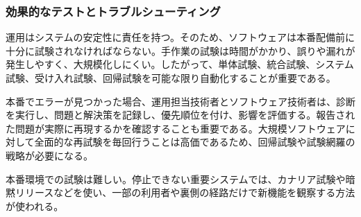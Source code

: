 \subsubsection{効果的なテストとトラブルシューティング}

運用はシステムの安定性に責任を持つ。そのため、ソフトウェアは本番配備前に十分に試験されなければならない。手作業の試験は時間がかかり、誤りや漏れが発生しやすく、大規模化しにくい。したがって、単体試験、統合試験、システム試験、受け入れ試験、回帰試験を可能な限り自動化することが重要である。

本番でエラーが見つかった場合、運用担当技術者とソフトウェア技術者は、診断を実行し、問題と解決策を記録し、優先順位を付け、影響を評価する。報告された問題が実際に再現するかを確認することも重要である。大規模ソフトウェアに対して全面的な再試験を毎回行うことは高価であるため、回帰試験や試験網羅の戦略が必要になる。

本番環境での試験は難しい。停止できない重要システムでは、カナリア試験や暗黙リリースなどを使い、一部の利用者や裏側の経路だけで新機能を観察する方法が使われる。
